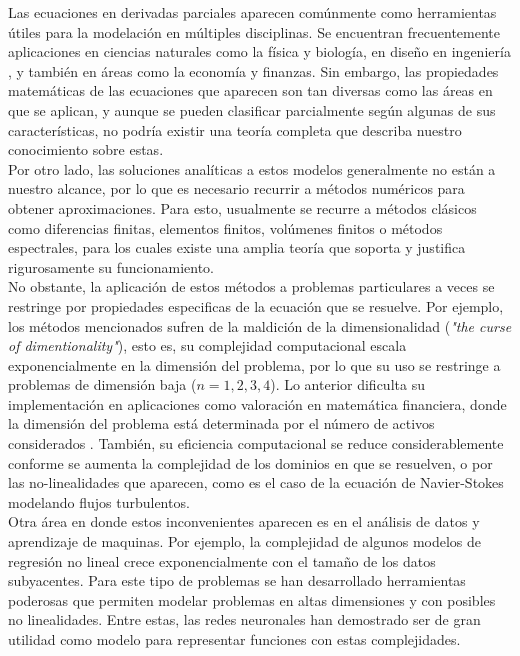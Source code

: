 Las ecuaciones en derivadas parciales aparecen comúnmente como herramientas útiles para la modelación en múltiples disciplinas. Se encuentran frecuentemente aplicaciones en ciencias naturales como la física y biología, en diseño en ingeniería , y también en áreas como la economía y finanzas. Sin embargo, las propiedades matemáticas de las ecuaciones que aparecen son tan diversas como las áreas en que se aplican, y aunque se pueden clasificar parcialmente según algunas de sus características, no podría existir una teoría completa que describa nuestro conocimiento sobre estas.\\

Por otro lado, las soluciones analíticas a estos modelos generalmente no están a nuestro alcance, por lo que es necesario recurrir a métodos numéricos para obtener aproximaciones. Para esto, usualmente se recurre a métodos clásicos como diferencias finitas, elementos finitos, volúmenes finitos o métodos espectrales, para los cuales existe una amplia teoría que soporta y justifica rigurosamente su funcionamiento.\\

No obstante, la aplicación de estos métodos a problemas particulares a veces se restringe por propiedades especificas de la ecuación que se resuelve. Por ejemplo, los métodos mencionados sufren de la maldición de la dimensionalidad (\textit{"the curse of dimentionality"}), esto es, su complejidad computacional escala exponencialmente en la dimensión del problema, por lo que su uso se restringe a problemas de dimensión baja ($n=1,2,3,4$). Lo anterior dificulta su implementación en aplicaciones como valoración en matemática financiera, donde la dimensión del problema está determinada por el número de activos considerados . También, su eficiencia computacional se reduce considerablemente conforme se aumenta la complejidad de los dominios en que se resuelven, o por las no-linealidades que aparecen, como es el caso de la ecuación de Navier-Stokes modelando flujos turbulentos.\\

Otra área en donde estos inconvenientes aparecen es en el análisis de datos y aprendizaje de maquinas. Por ejemplo, la complejidad de algunos modelos de regresión no lineal crece exponencialmente con el tamaño de los datos subyacentes. Para este tipo de problemas se han desarrollado herramientas poderosas que permiten modelar problemas en altas dimensiones y con posibles no linealidades. Entre estas, las redes neuronales han demostrado ser de gran utilidad como modelo para representar funciones con estas complejidades\cite{higham_deep_2019}.\\

